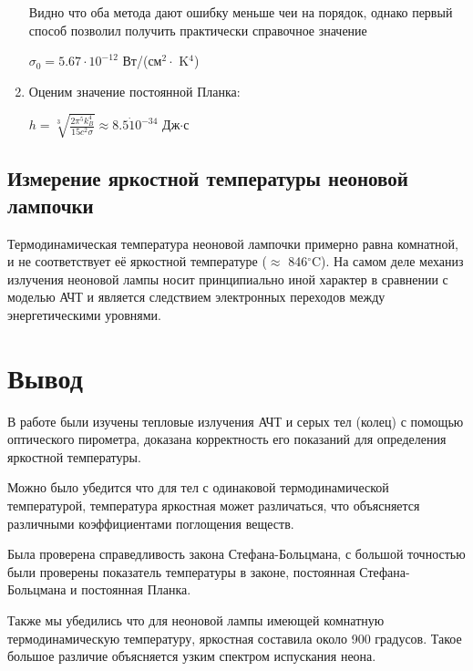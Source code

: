 \documentclass[a4paper, 12pt]{article}
\begin{document}
\begin{enumerate}
Видно что оба метода дают ошибку меньше чеи на порядок, однако первый способ позволил получить практически справочное значение
\begin{center}
    $\sigma_0= 5.67\cdot 10^{-12}$ Вт/(см$^2 \cdot$ K$^4$)
\end{center}

\item Оценим значение постоянной Планка:
\begin{center}
    $h = \sqrt[3]{\frac{2 \pi^5 k_B^4}{15 c^2 \sigma}} \approx 8.5 \dot 10^{-34}$ Дж$\cdot$с
\end{center}

\end{enumerate}

\subsection{Измерение яркостной температуры неоновой лампочки}
Термодинамическая температура неоновой лампочки примерно равна комнатной, и не соответствует её яркостной температуре ($\approx$ 846$^{\circ}$C). На самом деле механиз излучения неоновой лампы носит принципиально иной характер в сравнении с моделью АЧТ и является следствием электронных переходов между энергетическими уровнями.

\section{Вывод}
В работе были изучены тепловые излучения АЧТ и серых тел (колец) с помощью оптического пирометра, доказана корректность его показаний для определения яркостной температуры.

Можно было убедится что для тел с одинаковой термодинамической температурой, температура яркостная может различаться, что объясняется различными коэффициентами поглощения веществ.

Была проверена справедливость закона Стефана-Больцмана, с большой точностью были проверены показатель температуры в законе, постоянная Стефана-Больцмана и постоянная Планка.

Также мы убедились что для неоновой лампы имеющей комнатную термодинамическую температуру, яркостная составила около 900 градусов. Такое большое различие объясняется узким спектром испускания неона.
\end{document}
